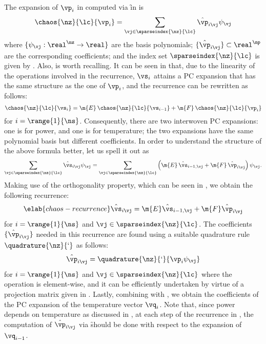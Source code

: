 The expansion of $\vp_i$ in  computed via \f in
 is
\[
  \chaos{\nz}{\lc}{\vp_i} = \sum_{\vj \in \sparseindex{\nz}{\lc}} \hat{\vp}_{i \vj} \psi_{\vj}
\]
where $\{ \psi_{\vj}: \real^\nz \to \real \}$ are the basis polynomials; $\{
\hat{\vp}_{i \vj} \} \subset \real^\np$ are the corresponding coefficients; and
the index set $\sparseindex{\nz}{\lc}$ is given by
. Also, 
is worth recalling. It can be seen in  that, due
to the linearity of the operations involved in the recurrence, $\vs_i$ attains a
\ac{PC} expansion that has the same structure as the one of $\vp_i$, and the
recurrence can be rewritten as follows:
\[
  \chaos{\nz}{\lc}{\vs_i} = \m{E} \, \chaos{\nz}{\lc}{\vs_{i - 1}} + \m{F} \, \chaos{\nz}{\lc}{\vp_i}
\]
for $i = \range{1}{\ns}$. Consequently, there are two interwoven \ac{PC}
expansions: one is for power, and one is for temperature; the two expansions
have the same polynomial basis but different coefficients. In order to
understand the structure of the above formula better, let us spell it out as
\[
  \sum_{\vj \in \sparseindex{\nz}{\lc}} \hat{\vs}_{i \vj} \psi_{\vj} =
  \sum_{\vj \in \sparseindex{\nz}{\lc}} \left(\m{E} \, \hat{\vs}_{i - 1, \vj} + \m{F} \, \hat{\vp}_{i \vj}\right) \psi_{\vj}.
\]
Making use of the orthogonality property, which can be seen in
, we obtain the following recurrence:
\begin{equation} \elab{chaos-recurrence}
  \hat{\vs}_{i \vj} = \m{E} \hat{\vs}_{i - 1, \vj} + \m{F} \hat{\vp}_{i \vj}
\end{equation}
for $i = \range{1}{\ns}$ and $\vj \in \sparseindex{\nz}{\lc}$. The coefficients
$\{ \hat{\vp}_{i \vj} \}$ needed in this recurrence are found using a suitable
quadrature rule $\quadrature{\nz}{\lq}$ as follows:
\[
  \hat{\vp}_{i \vj} = \quadrature{\nz}{\lq}{\vp_i \psi_{\vj}}
\]
for $i = \range{1}{\ns}$ and $\vj \in \sparseindex{\nz}{\lc}$ where the
operation is element-wise, and it can be efficiently undertaken by virtue of a
projection matrix given in . Lastly, combining
 with , we obtain the
coefficients of the \ac{PC} expansion of the temperature vector $\vq_i$. Note
that, since power depends on temperature as discussed in , at
each step of the recurrence in , the computation of
$\hat{\vp}_{i \vj}$ via \f should be done with respect to the expansion of
$\vq_{i - 1}$.


